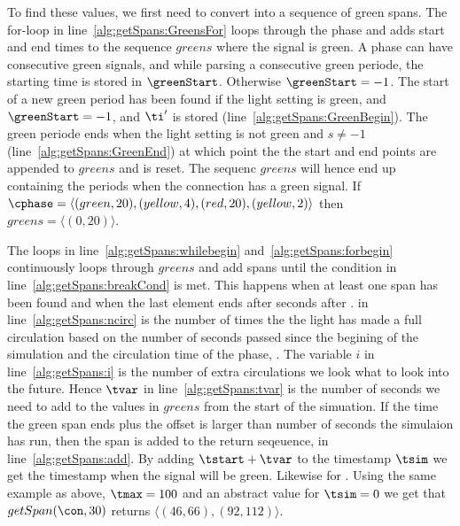 To find these values, we first need to convert \phase into a sequence of green spans.
The for-loop in line~\ref{alg:getSpans:GreensFor} loops through the phase and adds start and end times to the sequence $greens$ where the signal is green.
A phase can have consecutive green signals, and while parsing a consecutive green periode, the starting time is stored in $\greenStart$.
Otherwise $\greenStart=-1$.
The start of a new green period has been found if the light setting is green, and $\greenStart=-1$, and $\ti'$ is stored (line~\ref{alg:getSpans:GreenBegin}).
The green periode ends when the light setting is not green and $s\neq -1$ (line~\ref{alg:getSpans:GreenEnd}) at which point the the start and end points are appended to $greens$ and \greenStart is reset.
The sequenc $greens$ will hence end up containing the periods when the connection has a green signal.
If $\cphase=\langle (green, 20), (yellow, 4), (red, 20), (yellow, 2)\rangle$ then $greens=\langle (0,20)\rangle$.

The loops in line~\ref{alg:getSpans:whilebegin} and~\ref{alg:getSpans:forbegin} continuously loops through $greens$ and add spans until the condition in line~\ref{alg:getSpans:breakCond} is met.
This happens when at least one span has been found and when the last element ends after \tmax seconds after \ti.
\ncirc in line~\ref{alg:getSpans:ncirc} is the number of times the the light has made a full circulation based on the number of seconds passed since the begining of the simulation and the circulation time of the phase, \Ccirc{\phase}.
The variable $i$ in line~\ref{alg:getSpans:i} is the number of extra circulations we look what to look into the future.
Hence $\tvar$ in line~\ref{alg:getSpans:tvar} is the number of seconds we need to add to the values in $greens$ from the start of the simuation.
If the time the green span ends plus the offset is larger than number of seconds the simulaion has run, then the span is added to the return seqeuence, \spans in line~\ref{alg:getSpans:add}.
By adding $\tstart + \tvar$ to the timestamp $\tsim$ we get the timestamp when the signal will be green. 
Likewise for \tend.
Using the same example as above, $\tmax=100$ and an abstract value for $\tsim=0$ we get that $getSpan(\con, 30)$ returns $\langle(46,66), (92,112)\rangle$.%

